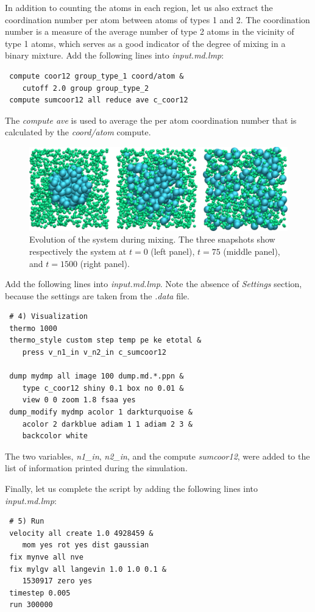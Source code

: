 \documentclass[9pt,tutorial]{livecoms}
\begin{document}
In addition to counting the atoms in each region, let us also extract
the coordination number per atom between atoms of types 1 and 2.  The
coordination number is a measure of the average number of type 2 atoms
in the vicinity of type 1 atoms, which serves as a good indicator of the
degree of mixing in a binary mixture.  Add the following lines into
\textit{input.md.lmp}:
{\normalsize
\begin{verbatim}
 compute coor12 group_type_1 coord/atom &
    cutoff 2.0 group group_type_2
 compute sumcoor12 all reduce ave c_coor12
\end{verbatim}
}
The \textit{compute ave} is used to average the per atom coordination
number that is calculated by the \textit{coord/atom} compute.

\begin{figure}
\centering
\includegraphics[width=\linewidth]{LJ-evolution}
\caption{Evolution of the system during mixing. The three snapshots show
respectively the system at $t=0$ (left panel), $t=75$ (middle panel), and $t=1500$
(right panel).}
\label{fig:evolution-population}
\end{figure}

Add the following lines into \textit{input.md.lmp}. Note the absence of
\textit{Settings} section, because the settings are taken from the
\textit{.data} file.
{\normalsize
\begin{verbatim}
 # 4) Visualization
 thermo 1000
 thermo_style custom step temp pe ke etotal &
    press v_n1_in v_n2_in c_sumcoor12

 dump mydmp all image 100 dump.md.*.ppn &
    type c_coor12 shiny 0.1 box no 0.01 &
    view 0 0 zoom 1.8 fsaa yes
 dump_modify mydmp acolor 1 darkturquoise &
    acolor 2 darkblue adiam 1 1 adiam 2 3 &
    backcolor white
\end{verbatim}
}
The two variables, \textit{n1\_in}, \textit{n2\_in}, and the compute
\textit{sumcoor12}, were added to the list of information printed during
the simulation.

Finally, let us complete the script by adding the following lines into
\textit{input.md.lmp}:
{\normalsize
\begin{verbatim}
 # 5) Run
 velocity all create 1.0 4928459 &
    mom yes rot yes dist gaussian
 fix mynve all nve
 fix mylgv all langevin 1.0 1.0 0.1 &
    1530917 zero yes
 timestep 0.005
 run 300000
\end{verbatim}
}
\end{document}
